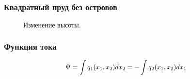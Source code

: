 \documentclass[10pt,utf8,presentation,compress]{beamer}
\begin{document}
\begin{frame}
\frametitle{Квадратный пруд без островов}
	\begin{figure}[H]
		\centering
		\hfill
		\hfill
		\caption{Изменение высоты.}
	\end{figure}
\end{frame}

\begin{frame}
\frametitle{Функция тока}
	\begin{equation}
		\Large\Psi = \int q_1(x_1, x_2) dx_2 = - \int q_2(x_1, x_2) dx_1
	\end{equation}
\end{frame}
\end{document}
